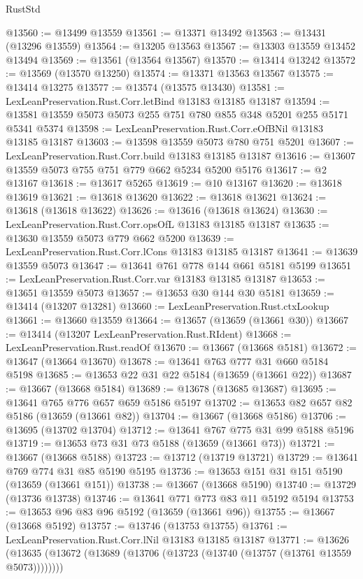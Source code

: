 \begin{lexlean}{RustStd}
\begin{coremodule}
@13560 := @13499 @13559
@13561 := @13371 @13492
@13563 := @13431 (@13296 @13559)
@13564 := @13205 @13563
@13567 := @13303 @13559 @13452 @13494
@13569 := @13561 (@13564 @13567)
@13570 := @13414 @13242
@13572 := @13569 (@13570 @13250)
@13574 := @13371 @13563 @13567
@13575 := @13414 @13275
@13577 := @13574 (@13575 @13430)
@13581 := LexLeanPreservation.Rust.Corr.letBind @13183 @13185 @13187
@13594 := @13581 @13559 @5073 @5073 @255 @751 @780 @855 @348 @5201 @255 @5171 @5341 @5374
@13598 := LexLeanPreservation.Rust.Corr.eOfBNil @13183 @13185 @13187
@13603 := @13598 @13559 @5073 @780 @751 @5201
@13607 := LexLeanPreservation.Rust.Corr.build @13183 @13185 @13187
@13616 := @13607 @13559 @5073 @755 @751 @779 @662 @5234 @5200 @5176
@13617 := @2 @13167
@13618 := @13617 @5265
@13619 := @10 @13167
@13620 := @13618 @13619
@13621 := @13618 @13620
@13622 := @13618 @13621
@13624 := @13618 (@13618 @13622)
@13626 := @13616 (@13618 @13624)
@13630 := LexLeanPreservation.Rust.Corr.opsOfL @13183 @13185 @13187
@13635 := @13630 @13559 @5073 @779 @662 @5200
@13639 := LexLeanPreservation.Rust.Corr.lCons @13183 @13185 @13187
@13641 := @13639 @13559 @5073
@13647 := @13641 @761 @778 @144 @661 @5181 @5199
@13651 := LexLeanPreservation.Rust.Corr.var @13183 @13185 @13187
@13653 := @13651 @13559 @5073
@13657 := @13653 @30 @144 @30 @5181
@13659 := @13414 (@13207 @13281)
@13660 := LexLeanPreservation.Rust.ctxLookup
@13661 := @13660 @13559
@13664 := @13657 (@13659 (@13661 @30))
@13667 := @13414 (@13207 LexLeanPreservation.Rust.RIdent)
@13668 := LexLeanPreservation.Rust.readOf
@13670 := @13667 (@13668 @5181)
@13672 := @13647 (@13664 @13670)
@13678 := @13641 @763 @777 @31 @660 @5184 @5198
@13685 := @13653 @22 @31 @22 @5184 (@13659 (@13661 @22))
@13687 := @13667 (@13668 @5184)
@13689 := @13678 (@13685 @13687)
@13695 := @13641 @765 @776 @657 @659 @5186 @5197
@13702 := @13653 @82 @657 @82 @5186 (@13659 (@13661 @82))
@13704 := @13667 (@13668 @5186)
@13706 := @13695 (@13702 @13704)
@13712 := @13641 @767 @775 @31 @99 @5188 @5196
@13719 := @13653 @73 @31 @73 @5188 (@13659 (@13661 @73))
@13721 := @13667 (@13668 @5188)
@13723 := @13712 (@13719 @13721)
@13729 := @13641 @769 @774 @31 @85 @5190 @5195
@13736 := @13653 @151 @31 @151 @5190 (@13659 (@13661 @151))
@13738 := @13667 (@13668 @5190)
@13740 := @13729 (@13736 @13738)
@13746 := @13641 @771 @773 @83 @11 @5192 @5194
@13753 := @13653 @96 @83 @96 @5192 (@13659 (@13661 @96))
@13755 := @13667 (@13668 @5192)
@13757 := @13746 (@13753 @13755)
@13761 := LexLeanPreservation.Rust.Corr.lNil @13183 @13185 @13187
@13771 := @13626
    (@13635 (@13672 (@13689 (@13706 (@13723 (@13740 (@13757 (@13761 @13559 @5073))))))))

\end{coremodule}
\end{lexlean}
